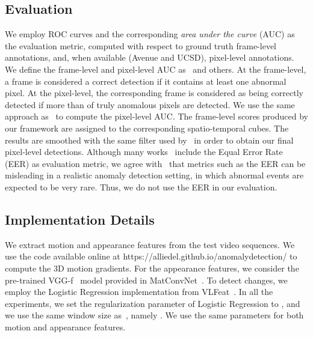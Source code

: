 \documentclass[10pt,twocolumn,letterpaper]{article}
\begin{document}
\subsection{Evaluation}

We employ ROC curves and the corresponding \emph{area under the curve} (AUC) as the evaluation metric, computed with respect to ground truth frame-level annotations, and, when available (Avenue and UCSD), pixel-level annotations. We define the frame-level and pixel-level AUC as~\cite{Cong-CVPR-2011, Giorno-ECCV-2016,Lu-ICCV-2013,Mahadevan-CVPR-2010} and others. At the frame-level, a frame is considered a correct detection if it contains at least one abnormal pixel. At the pixel-level, the corresponding frame is considered as being correctly detected if more than  of truly anomalous pixels are detected. We use the same approach as~\cite{Giorno-ECCV-2016,Lu-ICCV-2013} to compute the pixel-level AUC. The frame-level scores produced by our framework are assigned to the corresponding spatio-temporal cubes. The results are smoothed with the same filter used by~\cite{Giorno-ECCV-2016,Lu-ICCV-2013} in order to obtain our final pixel-level detections. Although many works~\cite{Cong-CVPR-2011,Dutta-AAAI-2015,Lu-ICCV-2013,Mahadevan-CVPR-2010,Xu-BMVC-2015,Zhang-PR-2016} include the Equal Error Rate (EER) as evaluation metric, we agree with~\cite{Giorno-ECCV-2016} that metrics such as the EER can be misleading in a realistic anomaly detection setting, in which abnormal events are expected to be very rare. Thus, we do not use the EER in our evaluation.

\subsection{Implementation Details}

We extract motion and appearance features from the test video sequences. We use the code available online at {https://alliedel.github.io/anomalydetection/} to compute the 3D motion gradients. For the appearance features, we consider the pre-trained VGG-f~\cite{Chatfield-BMVC-14} model provided in MatConvNet~\cite{matconvnet}. To detect changes, we employ the Logistic Regression implementation from VLFeat~\cite{vedaldi-vlfeat-2008}. In all the experiments, we set the regularization parameter of Logistic Regression to , and we use the same window size as~\cite{Giorno-ECCV-2016}, namely . We use the same parameters for both motion and appearance features.
\end{document}
